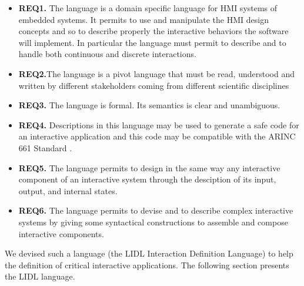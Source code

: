 \begin{itemize}
\item \textbf{REQ1.}  The language is  a domain specific  language for
HMI systems of embedded systems. It  permits to use and manipulate the
HMI  design  concepts and  so  to  describe properly  the  interactive
behaviors the software will implement. In particular the language must
permit  to  describe  and  to  handle  both  continuous  and  discrete
interactions.
\item  \textbf{REQ2.}The language  is a  pivot language  that must  be
read,  understood and  written by  different stakeholders  coming from
different scientific disciplines
\item \textbf{REQ3.}  The language is  formal. Its semantics  is clear
and unambiguous.
\item  \textbf{REQ4.} Descriptions  in this  language may  be used  to
generate a safe code for an  interactive application and this code may
be compatible with the ARINC 661 Standard \cite{ARINC}.
\item \textbf{REQ5.}  The language permits  to design in the  same way
any  interactive  component  of  an  interactive  system  through  the
desciption of its input, output, and internal states.
\item \textbf{REQ6.}  The language permits  to devise and  to describe
complex interactive  systems by giving some  syntactical constructions
to assemble and compose interactive components.
\end{itemize}

We devised such a language  (the LIDL Interaction Definition Language)
to  help  the definition  of  critical  interactive applications.  The
following section presents the LIDL language.